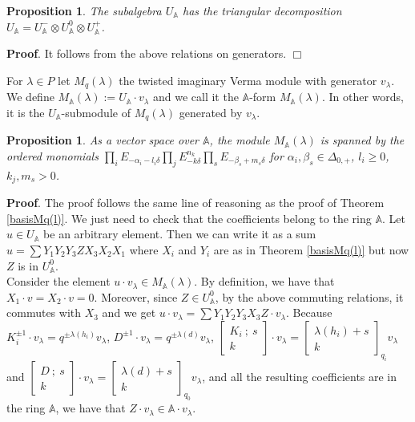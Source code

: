 \documentclass[12pt]{amsart}
\newtheorem{prop}[thm]{Proposition}
\numberwithin{equation}{section}
\newcommand{\dem }{\noindent\textbf{Proof}. }
\newcommand{\findem }{\hfill $\Box$ \vskip0.5cm }
\newcommand{\A}{\ensuremath{\mathbb{A}}}
\begin{document}
\begin{prop}
    The subalgebra $U_{\A}$ has the triangular decomposition $U_{\A} = U_{\A}^{-}\otimes U_{\A}^0 \otimes U_{\A}^{+}$.
\end{prop}

\dem It follows from the above relations on generators. \findem

For $\lambda \in P$ let $M_q(\lambda)$ the twisted imaginary Verma module with generator $v_\lambda$. We define $M_{\A}(\lambda) := U_{\A}\cdot v_{\lambda}$ and we call it the $\A$-form $M_{\A}(\lambda)$. In other words, it is the $U_{\A}$-submodule of $M_q(\lambda)$ generated by $v_\lambda$.

\begin{prop}\label{BasesM_A}
    As a vector space over $\A$, the module $M_{\A}(\lambda)$ is spanned by the ordered monomials $\prod_i E_{-\alpha_i-l_i\delta} \prod_j E_{-k\delta}^{n_k} \prod_s E_{-\beta_s + m_s\delta}$ for $\alpha_i, \beta_s \in \Delta_{0,+}$, $l_i\geq 0$, $k_j, m_s>0$.
\end{prop}

\dem The proof follows the same line of reasoning as the proof of Theorem \ref{basisMq(l)}. We just need to check that the coefficients belong to the ring $\A$. Let $u\in U_{\A}$ be an arbitrary element. Then we can write it as a sum $u = \sum Y_1Y_2Y_3ZX_3X_2X_1$ where $X_i$ and $Y_i$ are as in Theorem \ref{basisMq(l)} but now $Z$ is in $U_{\A}^0$.\\

Consider the element $u\cdot v_\lambda \in M_{\A}(\lambda)$. By definition, we have that $X_1\cdot v = X_2 \cdot v = 0$. Moreover, since $Z\in U_{\A}^0$, by the above commuting relations, it commutes with $X_3$ and we get $u \cdot v_\lambda = \sum Y_1Y_2Y_3X_3Z\cdot v_\lambda$. Because $K_i^{\pm 1}\cdot v_\lambda = q^{\pm \lambda(h_i)}v_\lambda$, $D^{\pm 1}\cdot v_\lambda = q^{\pm \lambda(d)}v_\lambda$,  $\begin{bmatrix} K_i \ ;\  s \\ k \end{bmatrix}   \cdot v_\lambda = \begin{bmatrix} \lambda(h_i) + s\\ k \end{bmatrix}_{q_i} v_\lambda$ and $\begin{bmatrix} D \ ;\  s \\ k \end{bmatrix}   \cdot v_\lambda = \begin{bmatrix} \lambda(d) + s\\ k \end{bmatrix}_{q_0} v_\lambda$, and all the resulting coefficients are in the ring $\A$, we have that $Z\cdot v_\lambda \in \A\cdot v_{\lambda}$.\\
\end{document}

